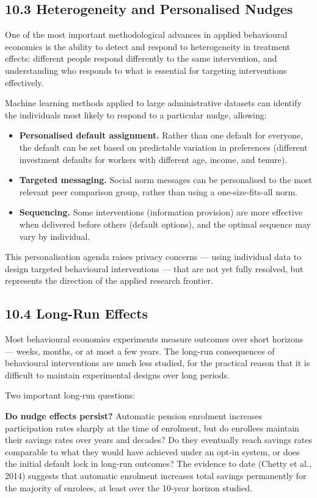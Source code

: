\documentclass[12pt, letterpaper]{article}
\begin{document}
\subsection{10.3 Heterogeneity and Personalised Nudges}


One of the most important methodological advances in applied behavioural economics is the ability to detect and respond to heterogeneity in treatment effects: different people respond differently to the same intervention, and understanding who responds to what is essential for targeting interventions effectively.

Machine learning methods applied to large administrative datasets can identify the individuals most likely to respond to a particular nudge, allowing:
\begin{itemize}
\item \textbf{Personalised default assignment.} Rather than one default for everyone, the default can be set based on predictable variation in preferences (different investment defaults for workers with different age, income, and tenure).
\item \textbf{Targeted messaging.} Social norm messages can be personalised to the most relevant peer comparison group, rather than using a one-size-fits-all norm.
\item \textbf{Sequencing.} Some interventions (information provision) are more effective when delivered before others (default options), and the optimal sequence may vary by individual.
\end{itemize}

This personalisation agenda raises privacy concerns --- using individual data to design targeted behavioural interventions --- that are not yet fully resolved, but represents the direction of the applied research frontier.


\subsection{10.4 Long-Run Effects}


Most behavioural economics experiments measure outcomes over short horizons --- weeks, months, or at most a few years. The long-run consequences of behavioural interventions are much less studied, for the practical reason that it is difficult to maintain experimental designs over long periods.

Two important long-run questions:

\textbf{Do nudge effects persist?} Automatic pension enrolment increases participation rates sharply at the time of enrolment, but do enrollees maintain their savings rates over years and decades? Do they eventually reach savings rates comparable to what they would have achieved under an opt-in system, or does the initial default lock in long-run outcomes? The evidence to date (Chetty et al., 2014) suggests that automatic enrolment increases total savings permanently for the majority of enrolees, at least over the 10-year horizon studied.
\end{document}
